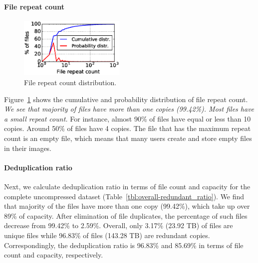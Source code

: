 \paragraph{File repeat count}
\begin{figure}
	\centering
	\includegraphics[width=0.45\textwidth]{graphs/File_repeat_count.eps}
	\caption{File repeat count distribution.
	}
	\label{fig:file-repeat-cnt}
\end{figure}

Figure~\ref{fig:file-repeat-cnt} shows the cumulative and probability
distribution of file repeat count.  \textit{We see that majority of files have
more than one copies (99.42\%).  Most files have a small repeat count.} For
instance, almost 90\% of files have equal or less than 10 copies. Around 50\%
of files have 4 copies. The file that has the maximum repeat count is an empty
file, which means that many users create and store empty files in their
images.

\paragraph{Deduplication ratio}
Next, we calculate deduplication ratio in terms of file count and capacity for
the complete uncompressed dataset (Table~\ref{tbl:overall-redundant_ratio}).
We find that majority of the files have more than one copy (99.42\%), which
take up over 89\% of capacity.
After elimination of file duplicates, the
percentage of such files decrease from 99.42\% to 2.59\%. 
Overall, only 3.17\% (23.92 TB) of files are unique files while 96.83\% of files 
(143.28 TB) are redundant copies. Correspondingly, the deduplication ratio is 96.83\%
and 85.69\% in terms of file count and capacity, respectively.

